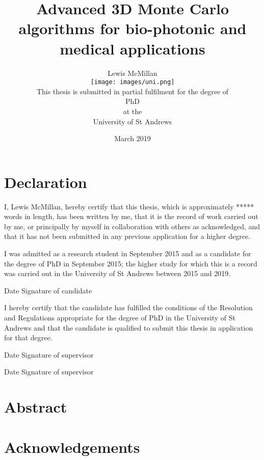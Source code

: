 \documentclass[10pt,a4paper,twoside]{book}
\title{Advanced 3D Monte Carlo algorithms for bio-photonic and medical applications}
\author{\Large Lewis McMillan\\
\texttt{[image: images/uni.png]}\\
This thesis is submitted in partial fulfilment for the degree of \\
PhD\\ 
at the \\
University of St Andrews}
\date{March 2019}
\begin{document}
\frontmatter%

\maketitle
{}%

\chapter{Declaration}
I, Lewis McMillan, hereby certify that this thesis, which is approximately ***** words in length,
has been written by me, that it is the record of work carried out by me, or principally by myself in collaboration with others as acknowledged, and that it has not been submitted in any
previous application for a higher degree.
\medskip

I was admitted as a research student in September 2015 and as a candidate for the degree
of PhD in September 2015; the higher study for which this is a record was carried out in the
University of St Andrews between 2015 and 2019.

\medskip

Date\dotfill \hspace{1cm} Signature of candidate \dotfill

\medskip

I hereby certify that the candidate has fulfilled the conditions of the Resolution and Regulations appropriate for the degree of PhD in the University of St Andrews and that the candidate
is qualified to submit this thesis in application for that degree.

\medskip

Date\dotfill \hspace{1cm} Signature of supervisor \dotfill

\medskip

\indent Date\dotfill \hspace{1cm} Signature of supervisor \dotfill

\chapter{Abstract}
\lipsum[1-2]

\chapter{Acknowledgements}
\lipsum[1-2]

\tableofcontents

\listoffigures
{}

\mainmatter

%
%


%
%
%
%



\end{document}
